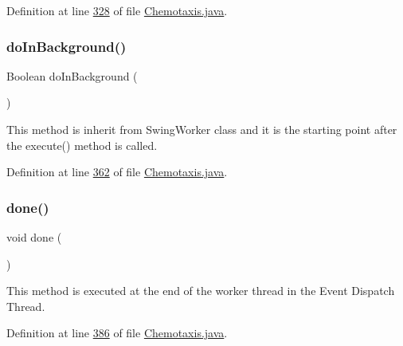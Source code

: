 Definition at line \hyperlink{_chemotaxis_8java_source_l00328}{328} of file \hyperlink{_chemotaxis_8java_source}{Chemotaxis.\+java}.

\hypertarget{classanalysis_1_1_chemotaxis_ab048bf7b5ce8c46bb48b99b8d0999110}{}\label{classanalysis_1_1_chemotaxis_ab048bf7b5ce8c46bb48b99b8d0999110} 
\subsubsection{\texorpdfstring{do\+In\+Background()}{doInBackground()}}
{\footnotesize\ttfamily Boolean do\+In\+Background (\begin{DoxyParamCaption}{ }\end{DoxyParamCaption})}

This method is inherit from Swing\+Worker class and it is the starting point after the execute() method is called. 

Definition at line \hyperlink{_chemotaxis_8java_source_l00362}{362} of file \hyperlink{_chemotaxis_8java_source}{Chemotaxis.\+java}.

\hypertarget{classanalysis_1_1_chemotaxis_ab650651e4cda2869f73100c6fd2c821a}{}\label{classanalysis_1_1_chemotaxis_ab650651e4cda2869f73100c6fd2c821a} 
\subsubsection{\texorpdfstring{done()}{done()}}
{\footnotesize\ttfamily void done (\begin{DoxyParamCaption}{ }\end{DoxyParamCaption})\hspace{0.3cm}{\ttfamily [protected]}}

This method is executed at the end of the worker thread in the Event Dispatch Thread. 

Definition at line \hyperlink{_chemotaxis_8java_source_l00386}{386} of file \hyperlink{_chemotaxis_8java_source}{Chemotaxis.\+java}.

\hypertarget{classanalysis_1_1_chemotaxis_ab864eab3ca8e5147e34d6a4747d24e72}{}\label{classanalysis_1_1_chemotaxis_ab864eab3ca8e5147e34d6a4747d24e72} 
